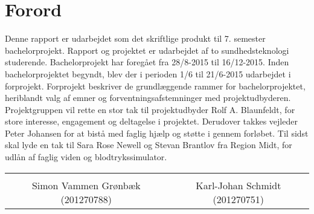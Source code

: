\chapter*{Forord}

Denne rapport er udarbejdet som det skriftlige produkt til 7. semester bachelorprojekt. Rapport og projektet er udarbejdet af to sundhedsteknologi studerende. Bachelorprojekt har foregået fra 28/8-2015 til 16/12-2015. Inden bachelorprojektet begyndt, blev der i perioden 1/6 til 21/6-2015 udarbejdet i forprojekt. Forprojekt beskriver de grundlæggende rammer for bachelorprojektet, heriblandt valg af emner og forventningsafstemninger med projektudbyderen. 
Projektgruppen vil rette en stor tak til projektudbyder Rolf A. Blaunfeldt, for store interesse, engagement og deltagelse i projektet. Derudover takkes vejleder Peter Johansen for at bistå med faglig hjælp og støtte i gennem forløbet. Til sidst skal lyde en tak til Sara Rose Newell og Stevan Brantlov fra Region Midt, for udlån af faglig viden og blodtrykssimulator. 

\vspace{3cm}

\begin{table}[H]
	\centering
	\begin{tabular}{c c}
		\underline{\phantom{mmmmmmmmmmmmmmmmmmmmm}} & \underline{\phantom{mmmmmmmmmmmmmmmmmmmmm}} \\
		Simon Vammen Grønbæk (201270788) \vspace{2cm} & Karl-Johan Schmidt (201270751) \vspace{2cm}\\
	\end{tabular}
\end{table}